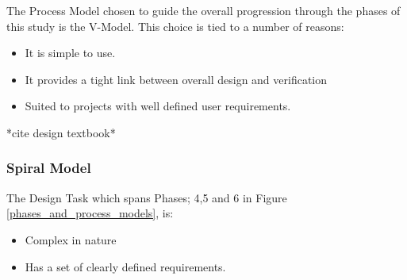 The Process Model chosen to guide the overall progression through the phases of
this study is the V-Model. This choice is tied to a number of reasons: 
\begin{itemize}
    \item It is simple to use.
    \item It provides a tight link between overall design and verification 
    \item Suited to projects with well defined user requirements.
\end{itemize}

*cite design textbook*

\subsubsection{Spiral Model}
The Design Task which spans Phases; 4,5 and 6 in Figure 
\ref{phases_and_process_models}, is: 
\begin{itemize}
    \item Complex in nature
    \item Has a set of clearly defined requirements. 
\end{itemize}













